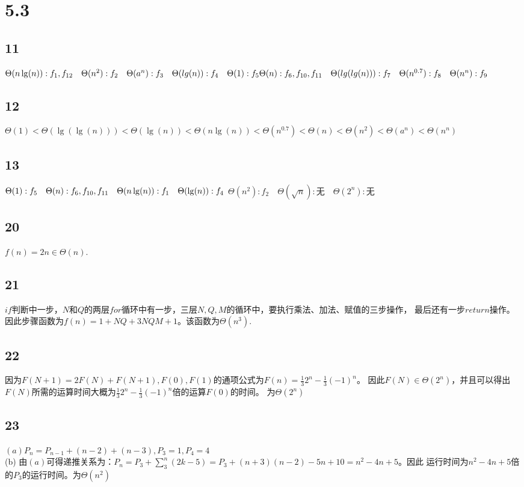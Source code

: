 \documentclass{article}
\begin{document}
\section{5.3}
\subsection{11}
$\Theta(n\lg(n)):f_1, f_{12} \quad \Theta(n^2):f_2 \quad \Theta(a^n):f_3 \quad \Theta(lg(n)):f_4 \quad \Theta(1):f_5\\
\Theta(n):f_6, f_{10}, f_{11} \quad \Theta(lg(lg(n))): f_7 \quad \Theta(n^{0.7}): f_8 \quad \Theta(n^n):f_9$
\subsection{12}
$\Theta(1) < \Theta(\lg(\lg(n))) < \Theta(\lg(n)) < \Theta(n\lg(n)) < \Theta(n^{0.7}) < \Theta(n) < \Theta(n^2)
< \Theta(a^n) < \Theta(n^n)$
\subsection{13}
$\Theta(1) : f_5 \quad \Theta(n) : f_6, f_{10}, f_{11} \quad \Theta(n\lg(n)) : f_1 \quad \Theta(\lg(n)) : f_4\\$
$\Theta(n^2) : f_2 \quad \Theta(\sqrt{n}): \text{无} \quad \Theta(2^n) : \text{无}$
\subsection{20}
$f(n) = 2n \in \Theta(n)$.
\subsection{21}
$if$判断中一步，$N$和$Q$的两层$for$循环中有一步，三层$N, Q, M$的循环中，要执行乘法、加法、赋值的三步操作，
最后还有一步$return$操作。因此步骤函数为$f(n) = 1 + NQ + 3NQM + 1$。该函数为$\Theta(n^3)$.
\subsection{22}
因为$F(N + 1) = 2F(N) + F(N + 1), F(0), F(1)$的通项公式为$F(n) = \frac{1}{3}2^n - \frac{1}{3}(-1)^n$。
因此$F(N) \in \Theta(2^n)$，并且可以得出$F(N)$所需的运算时间大概为$\frac{1}{3}2^n - \frac{1}{3}(-1)^n$倍的运算$F(0)$的时间。
为$\Theta(2^n)$
\subsection{23}
$(a) P_n = P_{n - 1} + (n - 2) + (n - 3), P_3 = 1, P_4 = 4$\\
(b) 由$(a)$可得递推关系为：$P_n = P_3 + \sum_{3}^{n}(2k - 5) = P_3 + (n + 3)(n - 2) - 5n + 10 = n^2 - 4n + 5$。因此
运行时间为$n^2 - 4n + 5$倍的$P_3$的运行时间。为$\Theta(n^2)$
\end{document}
